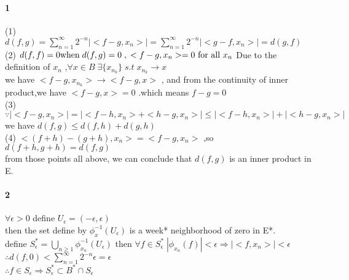 \documentclass[11pt]{article}
\begin{document}
\paragraph{1}
(1) $\displaystyle d(f,g) = \sum_{n=1}^{\infty}2^{-n}|<f-g,x_n>| = \sum_{n=1}^{\infty}2^{-n}|<g-f,x_n>| = d(g,f)$\\
(2) $\displaystyle d(f,f) = 0\\
\text{when} \; d(f,g) = 0 \;,\; <f-g,x_n> = 0 \text{ for all } x_n\\
$
Due to the definition of $x_n$ ,$\forall x \in B \; \exists \{x_{n_k}\} \; s.t \; x_{n_k} \to x$ \\
we have $<f-g ,x_{n_k}> \to <f-g,x>$ , and from the continuity of inner product,we have $<f-g,x> = 0$ .which means $f - g = 0 $\\
(3) $$\because |<f-g,x_n>| = |<f -h,x_n> +<h - g ,x_n>| \leq |<f - h,x_n>| + |<h - g ,x_n>|$$
we have $d(f,g) \leq d(f,h) + d(g,h)$\\
(4) $<(f + h) -(g+h) ,x_n> = <f-g,x_n>$ ,so $d(f+h,g+h) = d(f,g)$\\
from those points all above, we can conclude that $d(f,g) $ is an inner product in E.
\paragraph{2}
$\forall \epsilon > 0$ define $U_\epsilon = (-\epsilon,\epsilon)$\\
then the set define by $ \phi^{-1}_x(U_\epsilon)$ is a week* neighborhood of zero in E*.\\
define $\displaystyle  S^*_\epsilon = \bigcup_{n \geq 1}\phi^{-1}_{x_n}(U_\epsilon) $ 
then $\displaystyle  \forall f \in S^*_\epsilon \; |\phi_{x_n}(f)| < \epsilon  \Rightarrow |<f,x_n>| < \epsilon$\\
$\therefore d(f,0) < \sum_{n =1}^{\infty}2^{-n}\epsilon = \epsilon$\\
$\therefore f \in S_\epsilon \Rightarrow S^*_\epsilon \subset B^*\cap S_\epsilon$\\
\end{document}
